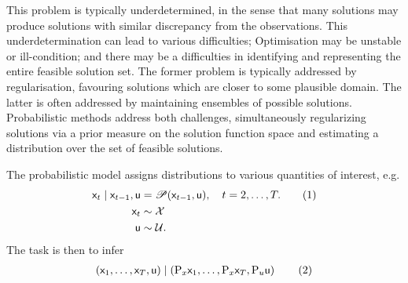 \documentclass{article}
\newcommand\numberthis{\addtocounter{equation}{1}\tag{\theequation}}
\newcommand{\mm}[1]{\mathrm{#1}}
\newcommand{\rv}[1]{\mathsf{#1}}
\newcommand{\dist}[1]{\mathcal{#1}}
\newcommand{\op}[1]{\mathscr{#1}}
\newcommand{\seenstate}[1]{\mm{P}_{x}{#1}}
\newcommand{\seeninp}[1]{\mm{P}_{u}{#1}}
\newcommand{\gvn}{\mid}
\newcommand{\inp}{\rv{u}}
\newcommand{\state}{\rv{x}}
\begin{document}
This problem is typically underdetermined, in the sense that many solutions may produce solutions with similar discrepancy from the observations.
This underdetermination can lead to various difficulties;
Optimisation may be unstable or ill-condition; and there may be a difficulties in identifying and representing the entire feasible solution set.
The former problem is typically addressed by regularisation, favouring solutions which are closer to some plausible domain.
The latter is often addressed by maintaining ensembles of possible solutions.
Probabilistic methods address both challenges, simultaneously regularizing solutions via a prior measure on the solution function space and estimating a distribution over the set of feasible solutions.

The probabilistic model assigns distributions to various quantities of interest, e.g.
\begin{align*}
\state_{t} \gvn \state_{t-1},\inp
&= \op{P}(\state_{t-1},\inp ), \quad t=2,\dots,T.
\numberthis \label{eq:proc_proj_sem} \\
\state_{t}
&\sim \dist{X}\\
\inp & \sim \dist{U}.
\end{align*}
The task is then to infer
\begin{align*}
\left(\state_{1},\dots, \state_{T},\inp \right)\gvn
\left(\seenstate{\state}_{1},\dots, \seenstate{\state}_{T},\seeninp{\inp}\right)
\numberthis \label{eq:proc_proj_sem_inv}
\end{align*}
\end{document}

